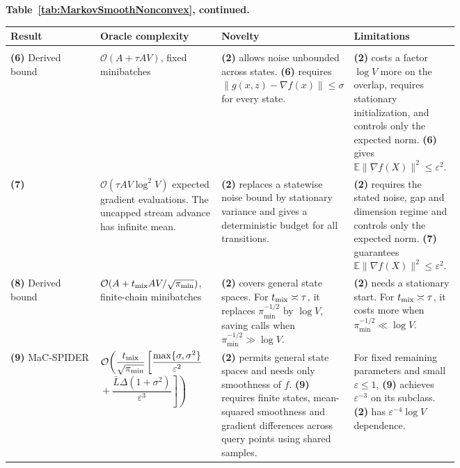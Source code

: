 \begin{table}[tp]
\centering
\parbox{\linewidth}{\footnotesize\textbf{Table~\ref{tab:MarkovSmoothNonconvex}, continued.}}\par\smallskip
\begin{threeparttable}
\footnotesize
\setlength{\tabcolsep}{4pt}\renewcommand{\arraystretch}{1.25}
\begin{tabularx}{\linewidth}{@{}>{\raggedright\arraybackslash}p{0.20\linewidth}>{\raggedright\arraybackslash}p{0.27\linewidth}>{\raggedright\arraybackslash}p{0.28\linewidth}>{\raggedright\arraybackslash}X@{}}
\toprule
\textbf{Result} & \textbf{Oracle complexity} & \textbf{Novelty} & \textbf{Limitations} \\
\midrule
\multicolumn{4}{@{}l}{\textit{Prior upper bounds (sufficient budgets)}}\\
\textbf{(6)} Derived bound \citep[Lem.~1, Eq.~(6)]{NEURIPS2023_8c3e38ce} & $\mathcal{O}(A+\tau AV)$, fixed minibatches & \textbf{(2)} allows noise unbounded across states. \textbf{(6)} requires $\|g(x,z)-\nabla f(x)\|\le\sigma$ for every state. & \textbf{(2)} costs a factor $\log V$ more on the overlap, requires stationary initialization, and controls only the expected norm. \textbf{(6)} gives $\mathbb E\|\nabla f(X)\|^2\le\varepsilon^2$. \\
\midrule
\textbf{(7)} \citep[Cor.~2, $\delta=0$]{NEURIPS2023_8c3e38ce} & $\mathcal{O}(\tau AV\log^2 V)$ expected gradient evaluations. The uncapped stream advance has infinite mean. & \textbf{(2)} replaces a statewise noise bound by stationary variance and gives a deterministic budget for all transitions. & \textbf{(2)} requires the stated noise, gap and dimension regime and controls only the expected norm. \textbf{(7)} guarantees $\mathbb E\|\nabla f(X)\|^2\le\varepsilon^2$. \\
\midrule
\textbf{(8)} Derived bound \citep[Lem.~4.1(1)]{NEURIPS2025_1cdbce34} & $\mathcal{O}(A+t_{\rm mix}AV/\sqrt{\pi_{\min}})$, finite-chain minibatches & \textbf{(2)} covers general state spaces. For $t_{\rm mix}\asymp\tau$, it replaces $\pi_{\min}^{-1/2}$ by $\log V$, saving calls when $\pi_{\min}^{-1/2}\gg\log V$. & \textbf{(2)} needs a stationary start. For $t_{\rm mix}\asymp\tau$, it costs more when $\pi_{\min}^{-1/2}\ll\log V$. \\
\midrule
\textbf{(9)} MaC-SPIDER \citep[Thm.~4.4]{NEURIPS2025_1cdbce34} & $\mathcal{O}\!\left(\dfrac{t_{\rm mix}}{\sqrt{\pi_{\min}}}\left[\dfrac{\max\{\sigma,\sigma^2\}}{\varepsilon^2}\right.\right.$\newline $\left.\left.{}+\dfrac{\bar L\Delta(1+\sigma^2)}{\varepsilon^3}\right]\right)$ & \textbf{(2)} permits general state spaces and needs only smoothness of $f$. \textbf{(9)} requires finite states, mean-squared smoothness and gradient differences across query points using shared samples. & For fixed remaining parameters and small $\varepsilon\le1$, \textbf{(9)} achieves $\varepsilon^{-3}$ on its subclass. \textbf{(2)} has $\varepsilon^{-4}\log V$ dependence. \\

\end{tabularx}
\end{threeparttable}
\end{table}
